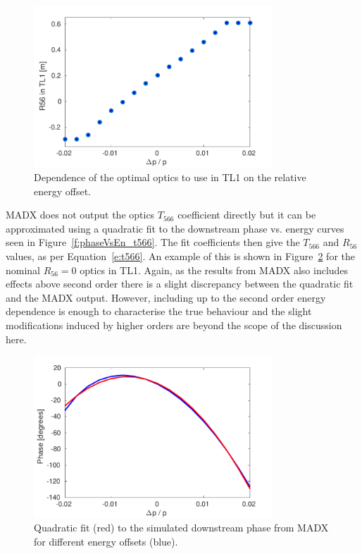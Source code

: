 \begin{figure}
  \centering
  \includegraphics[width=0.8\textwidth]{Figures/propagation/optR56vsEnergy}
  \caption{Dependence of the optimal optics to use in TL1 on the relative energy offset.}
  \label{f:optR56vsEnergy}
\end{figure}

MADX does not output the optics \(T_{566}\) coefficient directly but it can be approximated using a quadratic fit to the downstream phase vs. energy curves seen in Figure~\ref{f:phaseVsEn_t566}. The fit coefficients then give the \(T_{566}\) and \(R_{56}\) values, as per Equation~\ref{e:t566}. An example of this is shown in Figure~\ref{f:madxT566Fit} for the nominal \(R_{56}=0\) optics in TL1. Again, as the results from MADX also includes effects above second order there is a slight discrepancy between the quadratic fit and the MADX output. However, including up to the second order energy dependence is enough to characterise the true behaviour and the slight modifications induced by higher orders are beyond the scope of the discussion here.

\begin{figure}
  \centering
  \includegraphics[width=0.8\textwidth]{Figures/propagation/madxT566Fit}
  \caption{Quadratic fit (red) to the simulated downstream phase from MADX for different energy offsets (blue).}
  \label{f:madxT566Fit}
\end{figure}

